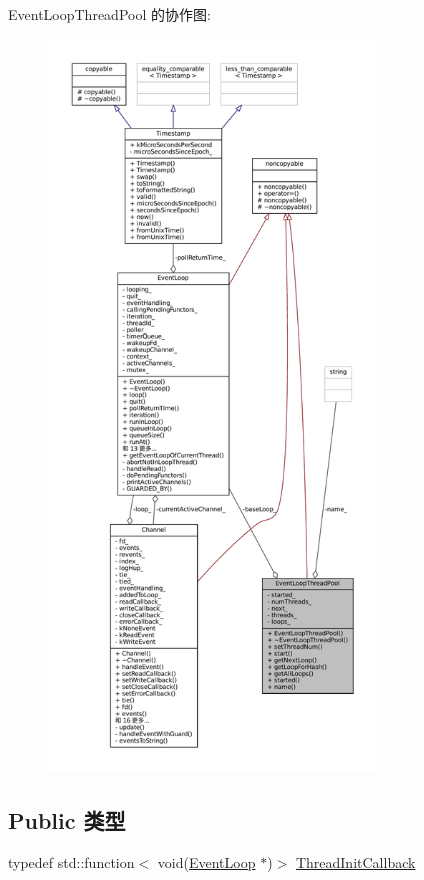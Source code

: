 Event\+Loop\+Thread\+Pool 的协作图\+:
\nopagebreak
\begin{figure}[H]
\begin{center}
\leavevmode
\includegraphics[height=550pt]{classmuduo_1_1net_1_1EventLoopThreadPool__coll__graph}
\end{center}
\end{figure}
\subsection*{Public 类型}
\begin{DoxyCompactItemize}
\item 
typedef std\+::function$<$ void(\hyperlink{classmuduo_1_1net_1_1EventLoop}{Event\+Loop} $\ast$)$>$ \hyperlink{classmuduo_1_1net_1_1EventLoopThreadPool_a4665880f4633f1e7d95fd6fef6811717}{Thread\+Init\+Callback}
\end{DoxyCompactItemize}
